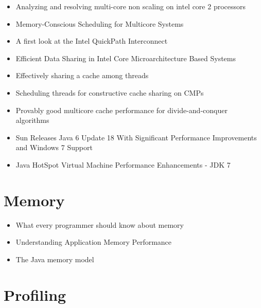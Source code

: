 \begin{itemize}
\item Analyzing and resolving multi-core non scaling on intel core 2
  processors \cite{Levinthal2007}
\item Memory-Conscious Scheduling for Multicore Systems \cite{Majo2010}
\item A first look at the Intel QuickPath Interconnect
  \cite{Maddox2009}
\item Efficient Data Sharing in Intel
  \textsuperscript{\textregistered} Core Microarchitecture Based
  Systems \cite{Shemer2007}
\item Effectively sharing a cache among threads \cite{Blelloch2004}
\item Scheduling threads for constructive cache sharing on CMPs
  \cite{Chen2007}
\item Provably good multicore cache performance for divide-and-conquer
  algorithms \cite{Blelloch2008}
\item[\checkmark] Sun Releases Java 6 Update 18 With Significant
  Performance Improvements and Windows 7 Support \cite{Humble2010}
\item[\checkmark] Java HotSpot Virtual Machine Performance
  Enhancements - JDK 7 \cite{Oracle2010}
\end{itemize}


\section*{Memory}
\label{sec:lr-memory}

\begin{itemize}
\item What every programmer should know about memory
  \cite{Drepper2007}
\item Understanding Application Memory Performance \cite{Drepper2008}
\item The Java memory model \cite{Manson2005}
\end{itemize}


\section*{Profiling}
\label{sec:lr-profiling}

